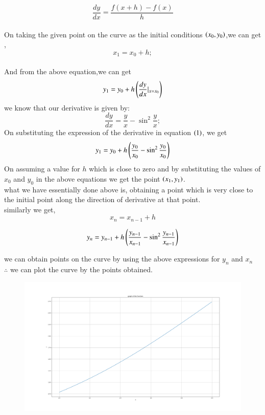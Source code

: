 \documentclass[journal]{IEEEtran}
\begin{document}
\[
    \frac{dy}{dx}=\frac{f(x+h)-f(x)}{h}            
\]
\hfill{}
\\
On taking the given point on the curve as the initial conditions $\left(x_0,y_0\right)$,we can get ,
\\
\[
x_1 = x_0 + h;
\]
\\
And from the above equation,we can get
\\
\[
y_1 = y_0 + h\left(\frac{dy}{dx}|_{x=x_0}\right) 
\]
we know that our derivative is given by:\\
\[
\frac{dy}{dx} = \frac{y}{x} - \sin^2{\frac{y}{x}};
\]
On substituting the expression of the derivative in equation $\left(1\right)$, we get
\\
\[
    y_1 = y_0 + h\left(\frac{y_0}{x_0} - \sin^2{\frac{y_0}{x_0}}\right) 
\]
On assuming a value for $h$ which is close to zero  and by substituting the values of $x_0$ and $y_0$ in the above equations we get the point $\left(x_1,y_1\right)$. \\
what we have essentially done above is, obtaining a point which is very close to the initial point along the direction of derivative at that point.\\

similarly we get,
\[
x_n = x_{n-1} + h
\]

\[
y_n = y_{n-1} + h\left(\frac{y_{n-1}}{x_{n-1}} - \sin^2{\frac{y_{n-1}}{x_{n-1}}}\right)
\]

we can obtain points on the curve by using the above expressions for $y_n$ and $x_n$\\
 
 $\therefore$ we can plot the curve by the points obtained.
\begin{figure}[h!]
   \centering
   \includegraphics[width=1\linewidth]{figures/Figure_1.png}
   \label{graph of the function}
\end{figure}
\end{document}
